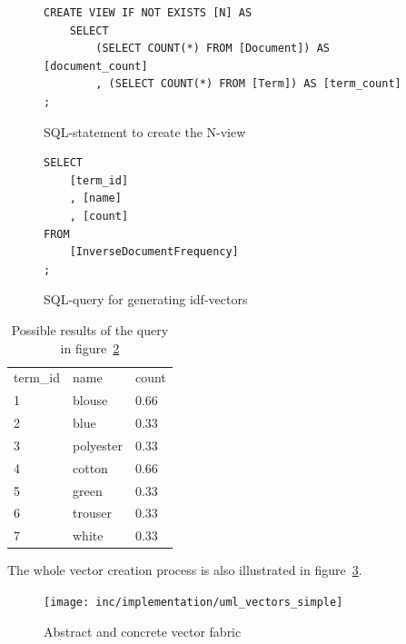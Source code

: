\begin{figure}
    \lstset{language=SQL}
    \begin{lstlisting}
CREATE VIEW IF NOT EXISTS [N] AS
    SELECT
        (SELECT COUNT(*) FROM [Document]) AS [document_count]
        , (SELECT COUNT(*) FROM [Term]) AS [term_count]
;
    \end{lstlisting}
    \caption{SQL-statement to create the N-view}
    \label{fig:n-view}
\end{figure}


\begin{figure}
    \lstset{language=SQL}
    \begin{lstlisting}
SELECT
    [term_id]
    , [name]
    , [count]
FROM
    [InverseDocumentFrequency]
;
    \end{lstlisting}
    \caption{SQL-query for generating idf-vectors}
    \label{fig:idf-query}
\end{figure}


\begin{table}
    \center
    \begin{tabular}{ l | l | l } 
        \rowcolor{LightSlateGrey}
        \multicolumn{3}{ c }{\textbf{idf}}\\\hline
        term\_id    & name      & count\\\hline
        1           & blouse    & 0.66\\
        2           & blue      & 0.33\\
        3           & polyester & 0.33\\
        4           & cotton    & 0.66\\
        5           & green     & 0.33\\
        6           & trouser   & 0.33\\
        7           & white     & 0.33\\
    \end{tabular}
    \caption{Possible results of the query in figure~\ref{fig:idf-query}}
    \label{tab:idf-query-result}
\end{table}




\noindent
The whole vector creation process is also illustrated in figure~\ref{fig:uml-vectorssimple}.
\begin{figure}[h]
    \center
    \texttt{[image: inc/implementation/uml\_vectors\_simple]}
    \caption{Abstract and concrete vector fabric}
    \label{fig:uml-vectorssimple}
\end{figure}


